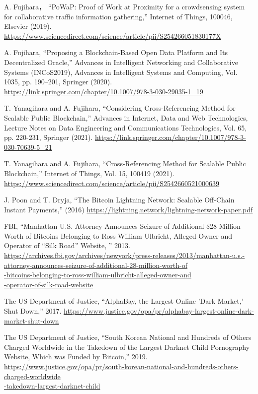 \documentclass[graybox]{svmult}
\begin{document}
\begin{thebibliography}{99}
  A. Fujihara，
  ``PoWaP: Proof of Work at Proximity for a crowdsensing system for 
  collaborative traffic information gathering,'' 
  Internet of Things, 100046, Elsevier (2019).
  \url{https://www.sciencedirect.com/science/article/pii/S254266051830177X}

  A. Fujihara, 
  ``Proposing a Blockchain-Based Open Data Platform and Its Decentralized Oracle,''
  Advances in Intelligent Networking and Collaborative Systems (INCoS2019), 
  Advances in Intelligent Systems and Computing, 
  Vol. 1035, pp. 190--201, Springer (2020).
  \url{https://link.springer.com/chapter/10.1007/978-3-030-29035-1_19}

  T. Yanagihara and A. Fujihara, 
  ``Considering Cross-Referencing Method for Scalable Public Blockchain,''
  Advances in Internet, Data and Web Technologies, 
  Lecture Notes on Data Engineering and Communications Technologies, 
  Vol. 65, pp. 220-231, Springer (2021). 
  \url{https://link.springer.com/chapter/10.1007/978-3-030-70639-5_21}

  T. Yanagihara and A. Fujihara,
  ``Cross-Referencing Method for Scalable Public Blockchain,''
  Internet of Things, Vol. 15, 100419 (2021). 
  \url{https://www.sciencedirect.com/science/article/pii/S2542660521000639}


  J. Poon and T. Dryja, 
  ``The Bitcoin Lightning Network: Scalable Off-Chain Instant Payments,'' 
  (2016) \url{https://lightning.network/lightning-network-paper.pdf}


  FBI, 
  ``Manhattan U.S. Attorney Announces Seizure of Additional \$28 Million 
    Worth of Bitcoins Belonging to Ross William Ulbricht, Alleged Owner 
    and Operator of ``Silk Road'' Website, '' 2013.
  \url{https://archives.fbi.gov/archives/newyork/press-releases/2013/manhattan-u.s.-attorney-announces-seizure-of-additional-28-million-worth-of}\\
  \url{-bitcoins-belonging-to-ross-william-ulbricht-alleged-owner-and}\\
  \url{-operator-of-silk-road-website}

  The US Department of Justice,
  ``AlphaBay, the Largest Online 'Dark Market,' Shut Down,'' 2017.
  \url{https://www.justice.gov/opa/pr/alphabay-largest-online-dark-market-shut-down}

  The US Department of Justice,
  ``South Korean National and Hundreds of Others Charged Worldwide in the Takedown 
    of the Largest Darknet Child Pornography Website, Which was Funded by Bitcoin,'' 
  2019.
  \url{https://www.justice.gov/opa/pr/south-korean-national-and-hundreds-others-charged-worldwide}\\
  \url{-takedown-largest-darknet-child}




\end{thebibliography}
\end{document}
